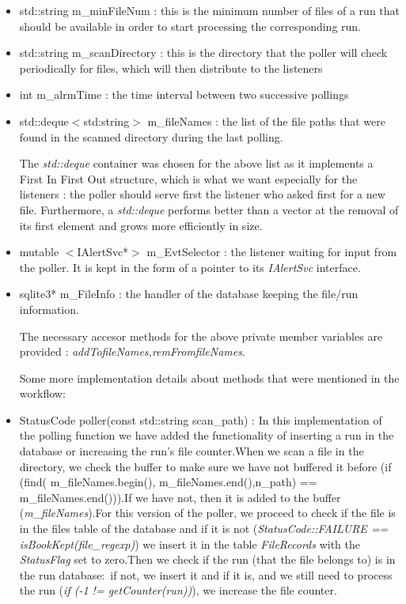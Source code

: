 \begin{itemize}

\item std::string m\_minFileNum : this is the minimum number of files of a run that should be available in order to start processing the corresponding run.\par 
\item std::string m\_scanDirectory : this is the directory that the poller will check periodically for files, which will then distribute to the listeners\par
\item int m\_alrmTime : the time interval between two successive pollings\par
\item std::deque$<$std:string$>$ m\_fileNames : the list of the file paths that were found in the scanned directory during the last polling.\par 
\bigskip\noindent
The \textit{std::deque} container was chosen for the above list as it implements a First In First Out structure, which is what we want especially for the listeners : the poller should serve first the listener who asked first for a new file. Furthermore, a  \textit{std::deque} performs better than a vector at the removal of its first element and grows more efficiently in size.\par
\bigskip\noindent
\item mutable $<$IAlertSvc*$>$ m\_EvtSelector : the listener waiting for input from the poller. It is kept in the form of a pointer to its \textit{IAlertSvc} interface.\par
\item sqlite3* m\_FileInfo : the handler of the database keeping the file/run information.\par
\bigskip\noindent
The necessary accesor methods for the above private member variables are provided : \textit{addTofileNames,remFromfileNames}.\par
Some more implementation details about methods that were mentioned in the workflow:\par

\item StatusCode poller(const std::string scan\_path) : In this implementation of the polling function we have added the functionality of inserting a run in the database or increasing the run's file counter.When we scan a file in the directory, we check the buffer to make sure we have not buffered it before (if (find( m\_fileNames.begin(),  m\_fileNames.end(),n\_path) ==  m\_fileNames.end())).If we have not, then it is added to the buffer (\textit{m\_fileNames}).For this version of the poller, we proceed to check if the file is in the files table of the database and if it is not (\textit{StatusCode::FAILURE == isBookKept(file\_regexp)}) we insert it in the table \textit{FileRecords} with the \textit{StatusFlag} set to zero.Then we check if the run (that the file belongs to) is in the run database:~if not, we insert it and if it is, and we still need to process the run (\textit{if (-1 != getCounter(run))}), we increase the file counter.\par


\end{itemize}

